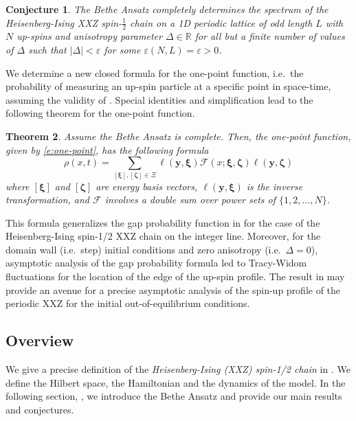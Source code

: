 \documentclass[a4paper,11pt]{article}
\newtheorem{theorem}{Theorem}[section]
\newtheorem{conjecture}[theorem]{Conjecture}
\theoremstyle{definition}
\begin{document}
\begin{conjecture}\label{c:main_v2}
    The Bethe Ansatz completely determines the spectrum of the Heisenberg-Ising XXZ spin-$\tfrac{1}{2}$ chain on a 1D periodic lattice of odd length $L$  with $N$ up-spins and anisotropy parameter $\Delta \in \mathbb{R}$ for all but a finite number of values of $\Delta$ such that $|\Delta| < \varepsilon$ for some $\varepsilon(N,L) = \varepsilon>0$.
\end{conjecture}

We determine a new closed formula for the one-point function, i.e.~the probability of measuring an up-spin particle at a specific point in space-time, assuming the validity of . Special identities and simplification lead to the following theorem for the one-point function.

\begin{theorem}\label{t:one-point function main}
    Assume the Bethe Ansatz is complete. Then, the one-point function, given by \eqref{e:one-point}, has the following formula 
\begin{equation}
    \rho(x,t) = \sum_{[\boldsymbol{\xi}], [\boldsymbol{\zeta}] \in \Xi} \ell(\mathbf{y}, \boldsymbol{\xi}) \mathcal{F}(x; \boldsymbol{\xi}, \boldsymbol{\zeta})\ell(\mathbf{y}, \boldsymbol{\zeta})
\end{equation}
where $[\mathbf{\boldsymbol{\xi}}]$ and $[\boldsymbol{\zeta}]$ are energy basis vectors,  $\ell(\mathbf{y},\mathbf{\boldsymbol{\xi}})$ is the inverse transformation, and $\mathcal{F}$ involves a double sum over power sets of $\{1,2,\ldots, N\}$.
\end{theorem}

This formula generalizes the gap probability function in \cite{saenz_domain_2022} for the case of the Heisenberg-Ising spin-1/2 XXZ chain on the integer line. Moreover, for the domain wall (i.e.~step) initial conditions and zero anisotropy (i.e.~$\Delta = 0$), asymptotic analysis of the gap probability formula led to Tracy-Widom fluctuations for the location of the edge of the up-spin profile. The result in  may provide an avenue for a precise asymptotic analysis of the spin-up profile of the periodic XXZ for the initial out-of-equilibrium conditions. 


\subsection{Overview}

We give a precise definition of the \emph{Heisenberg-Ising (XXZ) spin-1/2 chain} in . We define the Hilbert space, the Hamiltonian and the dynamics of the model. In the following section, , we introduce the Bethe Ansatz and provide our main results and conjectures. 
\end{document}
